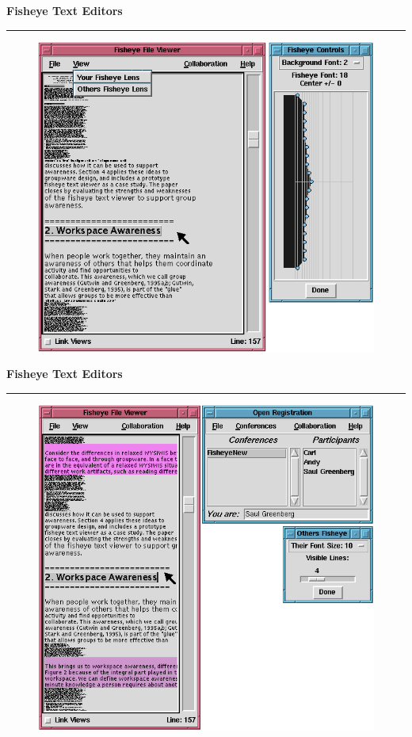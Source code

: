 \documentclass[pdf]{beamer}
\begin{document}
\begin{frame}
{\textbf{Fisheye Text Editors}}{\textcolor{red}{\rule{12cm}{1.2pt}}}

\begin{figure}
\includegraphics[scale=0.6]{34_fisheye_texta.png}
\end{figure}

\end{frame}



\begin{frame}
{\textbf{Fisheye Text Editors}}{\textcolor{red}{\rule{12cm}{1.2pt}}}

\begin{figure}
\includegraphics[scale=0.6]{34_fisheye_textb.png}
\end{figure}

\end{frame}
\end{document}
